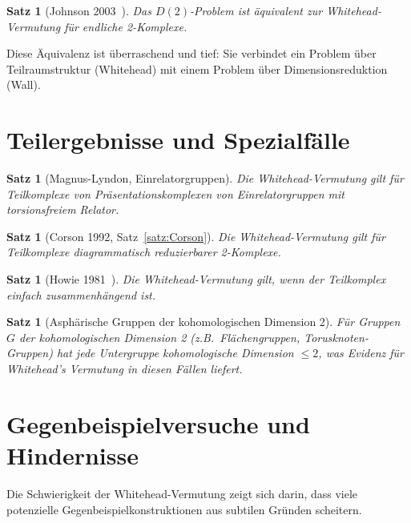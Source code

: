\documentclass[12pt,a4paper]{amsart}
\newtheorem{satz}[theorem]{Satz}
\theoremstyle{definition}
\theoremstyle{remark}
\begin{document}
\begin{satz}[Johnson 2003~\cite{Johnson2003}]
Das $D(2)$-Problem ist äquivalent zur Whitehead-Vermutung für endliche
2-Komplexe.
\end{satz}

Diese Äquivalenz ist überraschend und tief: Sie verbindet ein Problem
über Teilraumstruktur (Whitehead) mit einem Problem über Dimensionsreduktion
(Wall).

\section{Teilergebnisse und Spezialfälle}

\begin{satz}[Magnus-Lyndon, Einrelatorgruppen]
Die Whitehead-Vermutung gilt für Teilkomplexe von Präsentationskomplexen
von Einrelatorgruppen mit torsionsfreiem Relator.
\end{satz}

\begin{satz}[Corson 1992, Satz~\ref{satz:Corson}]
Die Whitehead-Vermutung gilt für Teilkomplexe diagrammatisch
reduzierbarer 2-Komplexe.
\end{satz}

\begin{satz}[Howie 1981~\cite{Howie1981}]
Die Whitehead-Vermutung gilt, wenn der Teilkomplex einfach zusammenhängend ist.
\end{satz}

\begin{satz}[Asphärische Gruppen der kohomologischen Dimension 2]
Für Gruppen $G$ der kohomologischen Dimension 2 (z.B.\ Flächengruppen,
Torusknoten-Gruppen) hat jede Untergruppe kohomologische Dimension $\leq 2$,
was Evidenz für Whitehead's Vermutung in diesen Fällen liefert.
\end{satz}

\section{Gegenbeispielversuche und Hindernisse}

Die Schwierigkeit der Whitehead-Vermutung zeigt sich darin, dass viele
potenzielle Gegenbeispielkonstruktionen aus subtilen Gründen scheitern.
\end{document}

